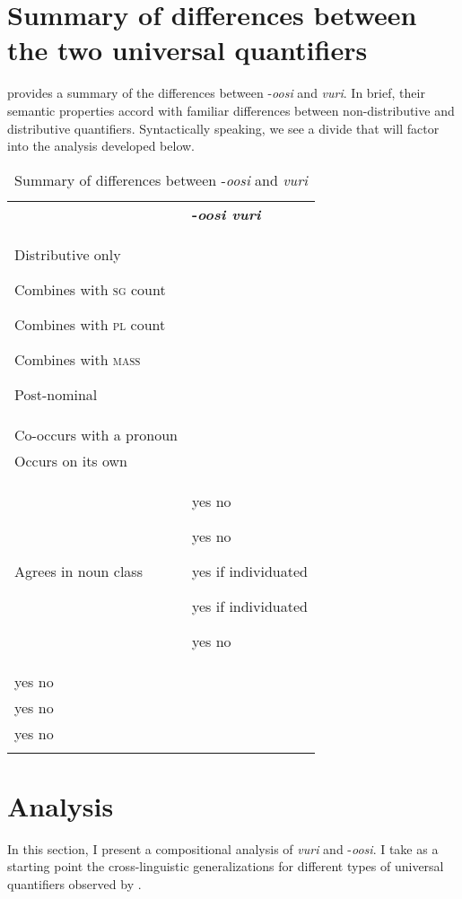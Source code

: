 \documentclass[output=paper]{langsci/langscibook}
\begin{document}
\section{Summary of differences between the two universal quantifiers}

 provides a summary of the differences between -\textit{oosi} and \textit{vuri}. In brief, their semantic properties accord with familiar differences between non-distributive and distributive\textit{} quantifiers. Syntactically speaking, we see a divide that will factor into the analysis developed below.

\begin{table}
\caption{Summary of differences between -\textit{oosi} and \textit{vuri}}
\label{tab:2}


\begin{tabularx}{\textwidth}{XX} & {\bfseries {}-\textit{oosi  vuri}}\\
\lsptoprule
{Distributive only}

{Combines with \textsc{sg} count}

{Combines with \textsc{pl} count}

{Combines with \textsc{mass}}

Post-nominal\\
Co-occurs with a pronoun\\
Occurs on its own\\
Agrees in noun class & yes  no 

yes  no

yes  if individuated

yes  if individuated

yes  no\\
yes  no\\
yes  no\\
yes  no  \\
\lspbottomrule
\end{tabularx}
\end{table}

\section{Analysis}

In this section, I present a compositional analysis of \textit{vuri} and -\textit{oosi}. I take as a starting point the cross-linguistic generalizations for different types of universal quantifiers observed by \citet{Matthewson2013}. 
\end{document}

